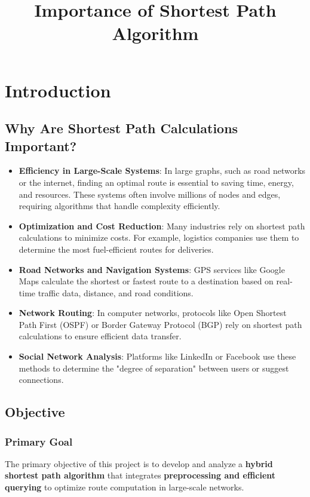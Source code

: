 \chapter{Introduction}

\title{Importance of Shortest Path Algorithm}

	\section{Why Are Shortest Path Calculations Important?}
	\begin{itemize}
		\item \textbf{Efficiency in Large-Scale Systems}: In large graphs, such as road networks or the internet, finding an optimal route is essential to saving time, energy, and resources. These systems often involve millions of nodes and edges, requiring algorithms that handle complexity efficiently.
		\item \textbf{Optimization and Cost Reduction}: Many industries rely on shortest path calculations to minimize costs. For example, logistics companies use them to determine the most fuel-efficient routes for deliveries.
		\item \textbf{Road Networks and Navigation Systems}: GPS services like Google Maps calculate the shortest or fastest route to a destination based on real-time traffic data, distance, and road conditions.
		\item \textbf{Network Routing}: In computer networks, protocols like Open Shortest Path First (OSPF) or Border Gateway Protocol (BGP) rely on shortest path calculations to ensure efficient data transfer.
		\item \textbf{Social Network Analysis}: Platforms like LinkedIn or Facebook use these methods to determine the "degree of separation" between users or suggest connections.
	\end{itemize}
	
	\section{Objective}
	
	\subsection{Primary Goal}
	The primary objective of this project is to develop and analyze a \textbf{hybrid shortest path algorithm} that integrates \textbf{preprocessing and efficient querying} to optimize route computation in large-scale networks. \\ \medskip
	
